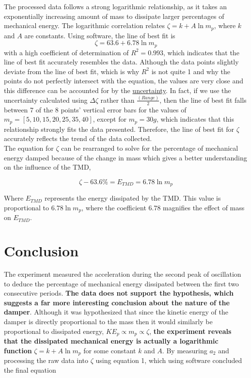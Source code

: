 \documentclass[11pt]{article}
\begin{document}
The processed data follows a strong logarithmic relationship, as it takes an exponentially increasing amount of mass to dissipate larger percentages of mechanical energy. The logarithmic correlation relates $\zeta = k + A\ln{m_p}$, where $k$ and $A$ are constants. Using software, the line of best fit is $$\zeta = 63.6 + 6.78\ln m_p$$ with a high coefficient of determination of $R^2 = 0.993$, which indicates that the line of best fit accurately resembles the data. Although the data points slightly deviate from the line of best fit, which is why $R^2$ is not quite 1 and why the points do not perfectly intersect with the equation, the values are very close and this difference can be accounted for by the \underline{uncertainty}. In fact, if we use the uncertainty calculated using $\Delta \zeta$ rather than $\frac{(Range)}{2}$, then the line of best fit falls between 7 of the 8 points' vertical error bars for the values of $m_p=[5,10,15,20,25,35,40]$, except for $m_p = 30g$, which indicates that this relationship strongly fits the data presented. Therefore, the line of best fit for $\zeta$ accurately reflects the trend of the data collected. \\


The equation for $\zeta$ can be rearranged to solve for the percentage of mechanical energy damped because of the change in mass which gives a better understanding on the influence of the TMD, 

$$ \zeta - 63.6\% = E_{TMD} = 6.78 \ln m_p$$

Where $E_{TMD}$ represents the energy dissipated by the TMD. This value is proportional to $6.78 \ln m_p$, where the coefficient $6.78$ magnifies the effect of mass on $E_{TMD}$.

\newpage

\section{Conclusion}

The experiment measured the acceleration during the second peak of oscillation to deduce the percentage of mechanical energy dissipated between the first two consecutive periods. \textbf{The data does not support the hypothesis, which suggests a far more interesting conclusion about the nature of the damper}. Although it was hypothesized that since the kinetic energy of the damper is directly proportional to the mass then it would similarly be proportional to dissipated energy, $KE_p \propto m_p \propto \zeta$, \textbf{the experiment reveals that the dissipated mechanical energy is actually a logarithmic function} $\zeta = k + A\ln m_p$ for some constant $k$ and $A$. By measuring $a_2$ and processing the raw data into $\zeta$ using equation 1, which using software concluded the final equation
\end{document}
